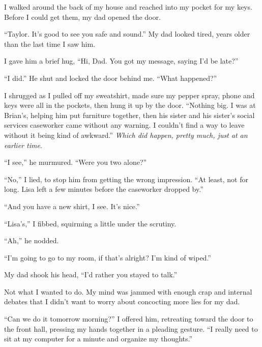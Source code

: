 I walked around the back of my house and reached into my pocket for my keys.  Before I could get them, my dad opened the door.



``Taylor.  It's good to see you safe and sound.''  My dad looked tired, years older than the last time I saw him.



I gave him a brief hug, ``Hi, Dad.  You got my message, saying I'd be late?''



``I did.''  He shut and locked the door behind me.  ``What happened?''



I shrugged as I pulled off my sweatshirt, made sure my pepper spray, phone and keys were all in the pockets, then hung it up by the door.  ``Nothing big.  I was at Brian's, helping him put furniture together, then his sister and his sister's social services caseworker came without any warning.  I couldn't find a way to leave without it being kind of awkward.''  \emph{Which did happen, pretty much, just at an earlier time.}



``I see,'' he murmured. ``Were you two alone?''



``No,'' I lied, to stop him from getting the wrong impression.  ``At least, not for long.  Lisa left a few minutes before the caseworker dropped by.''



``And you have a new shirt, I see.  It's nice.''



``Lisa's,'' I fibbed, squirming a little under the scrutiny.



``Ah,'' he nodded.



``I'm going to go to my room, if that's alright?  I'm kind of wiped.''



My dad shook his head, ``I'd rather you stayed to talk.''



Not what I wanted to do.  My mind was jammed with enough crap and internal debates that I didn't want to worry about concocting more lies for my dad.



``Can we do it tomorrow morning?'' I offered him, retreating toward the door to the front hall, pressing my hands together in a pleading gesture. ``I really need to sit at my computer for a minute and organize my thoughts.''



